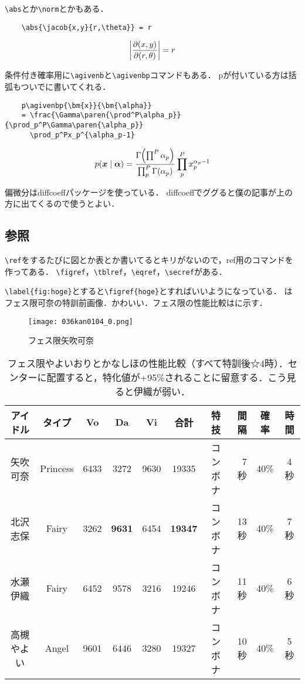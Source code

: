 \verb|\abs|とか\verb|\norm|とかもある．
\begin{verbatim}
    \abs{\jacob{x,y}{r,\theta}} = r
\end{verbatim}
\begin{equation}
    \abs{\jacob{x,y}{r,\theta}} = r
\end{equation}

条件付き確率用に\verb|\agivenb|と\verb|\agivenbp|コマンドもある．
pが付いている方は括弧もついでに書いてくれる．
\begin{verbatim}
    p\agivenbp{\bm{x}}{\bm{\alpha}}
    = \frac{\Gamma\paren{\prod^P\alpha_p}}{\prod_p^P\Gamma\paren{\alpha_p}}
      \prod_p^Px_p^{\alpha_p-1}
\end{verbatim}
\begin{equation}
    p\agivenbp{\bm{x}}{\bm{\alpha}} = \frac{\Gamma\paren{\prod^P\alpha_p}}{\prod_p^P\Gamma\paren{\alpha_p}}\prod_p^Px_p^{\alpha_p-1}
\end{equation}

偏微分はdiffcoeffパッケージを使っている．
diffcoeffでググると僕の記事が上の方に出てくるので使うとよい．

\subsection{参照}

\verb|\ref|をするたびに図とか表とか書いてるとキリがないので，ref用のコマンドを作ってある．
\verb|\figref|，\verb|\tblref|，\verb|\eqref|，\verb|\secref|がある．

\verb|\label{fig:hoge}|とすると\verb|\figref{hoge}|とすればいいようになっている．
はフェス限可奈の特訓前画像．かわいい．フェス限の性能比較はに示す．

\begin{figure}
    \centering
    \texttt{[image: 036kan0104\_0.png]}
    \caption{フェス限矢吹可奈}
    \label{fig:kana}
\end{figure}

\begin{table}
    \centering
    \caption[フェス限やよいおりとかなしほの性能比較]{フェス限やよいおりとかなしほの性能比較（すべて特訓後☆4時）．センターに配置すると，特化値が+95\%されることに留意する．こう見ると伊織が弱い．}
    \begin{tabular}{cc|cccc|crcc}
    アイドル & タイプ & Vo & Da  & Vi & 合計 & 特技 & 間隔 & 確率 & 時間 \\ \hline\hline
    矢吹可奈 & Princess & 6433 & 3272 & 9630 & 19335 & コンボナ & 7秒 & 40\% & 4秒 \\
    北沢志保 & Fairy & 3262 & \textbf{9631} & 6454 & \textbf{19347} & コンボナ & 13秒 & 40\% & 7秒 \\
    水瀬伊織 & Fairy & 6452 & 9578 & 3216 & 19246 & コンボナ & 11秒 & 40\% & 6秒 \\
    高槻やよい & Angel & 9601 & 6446 & 3280 & 19327 & コンボナ & 10秒 & 40\% & 5秒
    \end{tabular}
    \label{tbl:fes}
\end{table}

